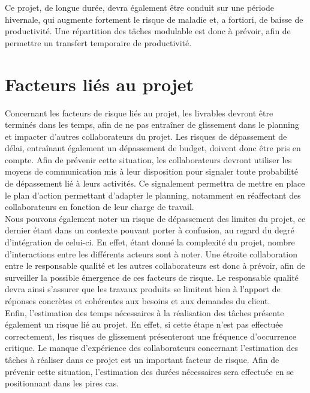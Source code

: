Ce projet, de longue durée, devra également être conduit sur une période hivernale, qui augmente fortement le risque de maladie et, a fortiori, de baisse de productivité. Une répartition des tâches modulable est donc à prévoir, afin de permettre un transfert temporaire de productivité. \\
 
\section{Facteurs liés au projet}
 
Concernant les facteurs de risque liés au projet, les livrables devront être terminés dans les temps, afin de ne pas entraîner de glissement dans le planning et impacter d’autres collaborateurs du projet. Les risques de dépassement de délai, entraînant également un dépassement de budget, doivent donc être pris en compte. Afin de prévenir cette situation, les collaborateurs devront utiliser les moyens de communication mis à leur disposition pour signaler toute probabilité de dépassement lié à leurs activités. Ce signalement permettra de mettre en place le plan d’action permettant d’adapter le planning, notamment en réaffectant des collaborateurs en fonction de leur charge de travail. \\
 
Nous pouvons également noter un risque de dépassement des limites du projet, ce dernier étant dans un contexte pouvant porter à confusion, au regard du degré d’intégration de celui-ci. En effet, étant donné la complexité du projet, nombre d’interactions entre les différents acteurs sont à noter. Une étroite collaboration entre le responsable qualité et les autres collaborateurs est donc à prévoir, afin de surveiller la possible émergence de ces facteurs de risque. Le responsable qualité devra ainsi s’assurer que les travaux produits se limitent bien à l’apport de réponses concrètes et cohérentes aux besoins et aux demandes du client. \\

Enfin, l’estimation des temps nécessaires à la réalisation des tâches présente également un risque lié au projet. En effet, si cette étape n’est pas effectuée correctement, les risques de glissement présenteront une fréquence d’occurrence critique. Le manque d’expérience des collaborateurs concernant l’estimation des tâches à réaliser dans ce projet est un important facteur de risque. Afin de prévenir cette situation, l’estimation des durées nécessaires sera effectuée en se positionnant dans les pires cas. \\
